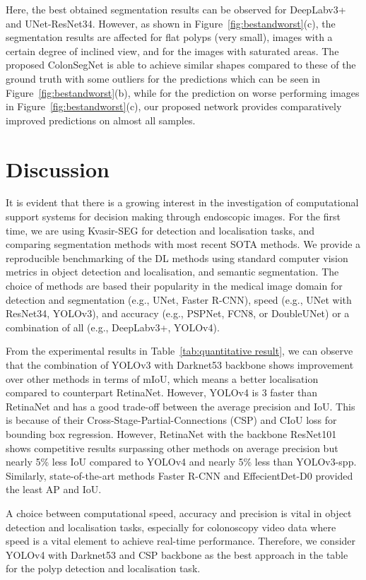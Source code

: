 \documentclass[journal]{IEEEtran}
\begin{document}
Here, the best obtained segmentation results can be observed for DeepLabv3+ and UNet-ResNet34. However, as shown in Figure~\ref{fig:bestandworst}(c), the segmentation results are affected for flat polyps (very small), images with a certain degree of inclined view, and for the images with saturated areas. The proposed ColonSegNet is able to achieve similar shapes compared to these of the ground truth with some outliers for the predictions which can be seen in Figure~\ref{fig:bestandworst}(b), while for the prediction on worse performing images in Figure~\ref{fig:bestandworst}(c), our proposed network provides comparatively improved predictions on almost all samples.


\section{Discussion}
\label{sec:discussion}
It is evident that there is a growing interest in the investigation of computational support systems for decision making through endoscopic images. For the first time, we are using Kvasir-SEG for detection and localisation tasks, and comparing segmentation methods with most recent SOTA methods. We provide a reproducible benchmarking of the \ac{DL} methods using standard computer vision metrics in object detection and localisation, and semantic segmentation. The choice of methods are based their popularity in the medical image domain for detection and segmentation (e.g., UNet, Faster R-CNN), speed (e.g., UNet with ResNet34, YOLOv3), and accuracy (e.g., PSPNet, FCN8, or DoubleUNet) or a combination of all (e.g., DeepLabv3+, YOLOv4). 

From the experimental results in Table~\ref{tab:quantitative result}, we can observe that the combination of YOLOv3 with Darknet53 backbone shows improvement over other methods in terms of mIoU, which means a better localisation compared to counterpart RetinaNet. However, YOLOv4 is 3 faster than RetinaNet and has a good trade-off between the average precision and IoU. This is because of their Cross-Stage-Partial-Connections (CSP) and CIoU loss for bounding box regression. However, RetinaNet with the backbone ResNet101 shows competitive results surpassing other methods on average precision but nearly 5\% less IoU compared to YOLOv4 and nearly 5\% less than YOLOv3-spp. Similarly, state-of-the-art methods Faster R-CNN and EffecientDet-D0 provided the least AP and IoU.

A choice between computational speed, accuracy and precision is vital in object detection and localisation tasks, especially for colonoscopy video data where speed is a vital element to achieve real-time performance. Therefore, we consider YOLOv4 with Darknet53 and CSP backbone as the best approach in the table for the polyp detection and localisation task.
\end{document}
